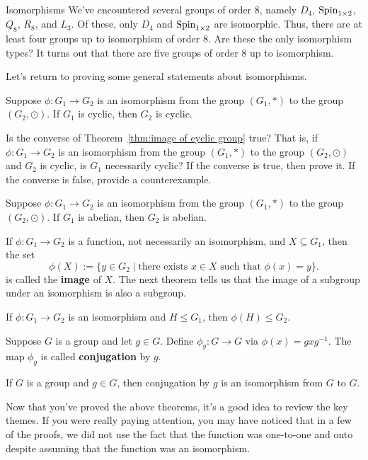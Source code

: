 \begin{section}{Isomorphisms}
We've encountered several groups of order 8, namely $D_4$, $\operatorname{Spin}_{1\times 2}$, $Q_8$, $R_8$, and $L_3$.  Of these, only $D_4$ and $\operatorname{Spin}_{1\times 2}$ are isomorphic.  Thus, there are at least four groups up to isomorphism of order 8.  Are these the only isomorphism types?  It turns out that there are five groups of order 8 up to isomorphism.

Let's return to proving some general statements about isomorphisms.

\begin{theorem}\label{thm:image of cyclic group}
Suppose $\phi:G_1\to G_2$ is an isomorphism from the group $(G_1,*)$ to the group $(G_2,\odot)$. If $G_1$ is cyclic, then $G_2$ is cyclic.
\end{theorem}

\begin{problem}
Is the converse of Theorem~\ref{thm:image of cyclic group} true?  That is, if $\phi:G_1\to G_2$ is an isomorphism from the group $(G_1,*)$ to the group $(G_2,\odot)$ and $G_2$ is cyclic, is $G_1$ necessarily cyclic?  If the converse is true, then prove it. If the converse is false, provide a counterexample.
\end{problem}

\begin{theorem}
Suppose $\phi:G_1\to G_2$ is an isomorphism from the group $(G_1,*)$ to the group $(G_2,\odot)$. If $G_1$ is abelian, then $G_2$ is abelian.
\end{theorem}

If $\phi:G_1\to G_2$ is a function, not necessarily an isomorphism, and $X\subseteq G_1$, then the set
\[
\phi(X):=\{y\in G_2\mid \text{there exists } x\in X\text{ such that }\phi(x)=y\}. 
\]
is called the \textbf{image} of $X$.  The next theorem tells us that the image of a subgroup under an isomorphism is also a subgroup.

\begin{theorem}
If $\phi:G_1\to G_2$ is an isomorphism and $H\leq G_1$, then $\phi(H)\leq G_2$.
\end{theorem}

Suppose $G$ is a group and let $g\in G$.  Define $\phi_g:G\to G$ via $\phi(x)=gxg^{-1}$.  The map $\phi_g$ is called \textbf{conjugation} by $g$.

\begin{theorem}
If $G$ is a group and $g\in G$, then conjugation by $g$ is an isomorphism from $G$ to $G$.
\end{theorem}

Now that you've proved the above theorems, it's a good idea to review the key themes.  If you were really paying attention, you may have noticed that in a few of the proofs, we did not use the fact that the function was one-to-one and onto despite assuming that the function was an isomorphism.


\end{section}
